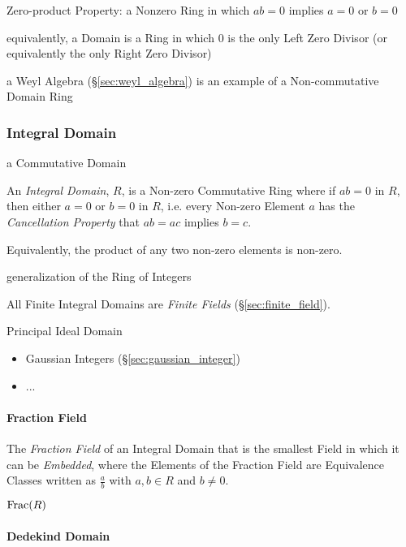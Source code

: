 Zero-product Property: a Nonzero Ring in which $ab = 0$ implies $a = 0$ or
$b = 0$

equivalently, a Domain is a Ring in which $0$ is the only Left Zero Divisor (or
equivalently the only Right Zero Divisor)

a Weyl Algebra (\S\ref{sec:weyl_algebra}) is an example of a Non-commutative
Domain Ring



\subsubsection{Integral Domain}\label{sec:integral_domain}

a Commutative Domain

An \emph{Integral Domain}, $R$, is a Non-zero Commutative Ring where if $ab = 0$
in $R$, then either $a = 0$ or $b = 0$ in $R$, i.e. every Non-zero Element $a$
has the \emph{Cancellation Property} that $ab = ac$ implies $b = c$.

Equivalently, the product of any two non-zero elements is non-zero.

generalization of the Ring of Integers

All Finite Integral Domains are \emph{Finite Fields} (\S\ref{sec:finite_field}).

Principal Ideal Domain

\begin{itemize}
  \item Gaussian Integers (\S\ref{sec:gaussian_integer})
  \item ...
\end{itemize}



\paragraph{Fraction Field}\label{sec:fraction_field}\hfill

The \emph{Fraction Field} of an Integral Domain that is the smallest Field in
which it can be \emph{Embedded}, where the Elements of the Fraction Field are
Equivalence Classes written as $\frac{a}{b}$ with $a, b \in R$ and $b \neq 0$.

$\mathrm{Frac}(R)$



\paragraph{Dedekind Domain}\label{sec:dedekind_domain}\hfill


